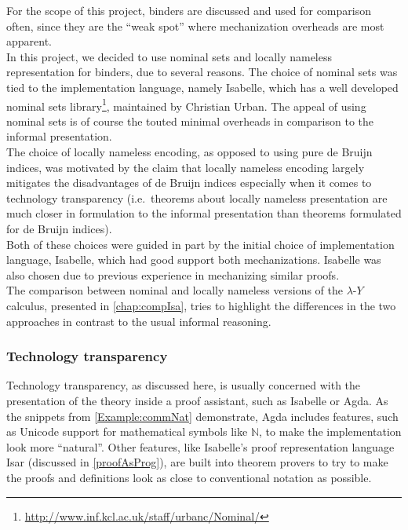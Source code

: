 \documentclass[a4paper, 12pt, twoside]{style/ociamthesis}
\theoremstyle{plain}
\theoremstyle{definition}
\theoremstyle{remark}
\renewcommand{\href}[2]{#2\footnote{\url{#1}}}
\newcommand{\lamy}{\lambda\text{-}Y}
\begin{document}
For the scope of this project, binders are discussed and used for
comparison often, since they are the ``weak spot'' where mechanization
overheads are most apparent.\\
In this project, we decided to use nominal sets and locally nameless
representation for binders, due to several reasons. The choice of
nominal sets was tied to the implementation language, namely Isabelle,
which has a well developed
\href{http://www.inf.kcl.ac.uk/staff/urbanc/Nominal/}{nominal sets
library}, maintained by Christian Urban. The appeal of using nominal
sets is of course the touted minimal overheads in comparison to the
informal presentation.\\
The choice of locally nameless encoding, as opposed to using pure de
Bruijn indices, was motivated by the claim that locally nameless
encoding largely mitigates the disadvantages of de Bruijn indices
especially when it comes to technology transparency (i.e.~theorems about
locally nameless presentation are much closer in formulation to the
informal presentation than theorems formulated for de Bruijn indices).\\
Both of these choices were guided in part by the initial choice of
implementation language, Isabelle, which had good support both
mechanizations. Isabelle was also chosen due to previous experience in
mechanizing similar proofs.\\
The comparison between nominal and locally nameless versions of the
\(\lamy\) calculus, presented in \cref{chap:compIsa}, tries to highlight
the differences in the two approaches in contrast to the usual informal
reasoning.

\subsubsection{Technology transparency}\label{technology-transparency}

Technology transparency, as discussed here, is usually concerned with
the presentation of the theory inside a proof assistant, such as
Isabelle or Agda. As the snippets from \cref{Example:commNat}
demonstrate, Agda includes features, such as Unicode support for
mathematical symbols like \(\mathbb{N}\), to make the implementation
look more ``natural''. Other features, like Isabelle's proof
representation language Isar (discussed in \cref{proofAsProg}), are
built into theorem provers to try to make the proofs and definitions
look as close to conventional notation as possible.
\end{document}
